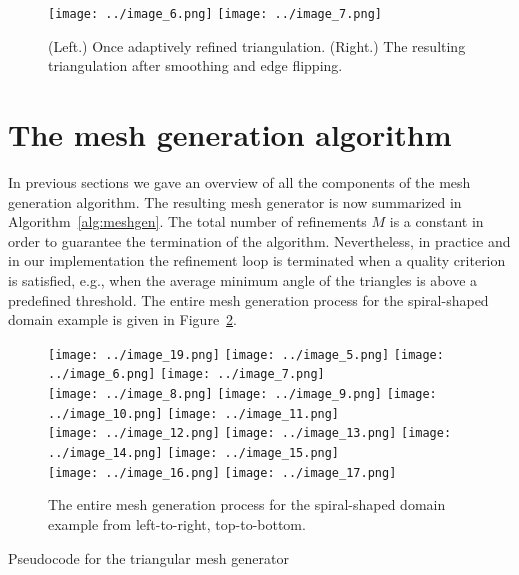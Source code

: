 \documentclass[12pt]{article}
\begin{document}
\begin{figure}[htbp]
\centering
\texttt{[image: ../image\_6.png]}
\texttt{[image: ../image\_7.png]}
\caption{(Left.) Once adaptively refined triangulation. (Right.) The resulting
  triangulation after smoothing and edge flipping.}
\label{fig:firstsmooth}
\end{figure}

\section{The mesh generation algorithm}
\label{sec:orgff9b6c1}

In previous sections we gave an overview of all the components of the mesh
generation algorithm.  The resulting mesh generator is now summarized in
Algorithm~\ref{alg:meshgen}.  The total number of refinements $M$ is a constant
in order to guarantee the termination of the algorithm.  Nevertheless, in
practice and in our implementation the refinement loop is terminated when a
quality criterion is satisfied, e.g., when the average minimum angle of the
triangles is above a predefined threshold.  The entire mesh generation process
for the spiral-shaped domain example is given in Figure~\ref{fig:spiralexample}.


\begin{figure}[htbp]
  \centering
  \texttt{[image: ../image\_19.png]}
  \texttt{[image: ../image\_5.png]}
  \texttt{[image: ../image\_6.png]}
  \texttt{[image: ../image\_7.png]}\\
  \texttt{[image: ../image\_8.png]}
  \texttt{[image: ../image\_9.png]}
  \texttt{[image: ../image\_10.png]}
  \texttt{[image: ../image\_11.png]}\\
  \texttt{[image: ../image\_12.png]}
  \texttt{[image: ../image\_13.png]}
  \texttt{[image: ../image\_14.png]}
  \texttt{[image: ../image\_15.png]}\\
  \texttt{[image: ../image\_16.png]}
  \texttt{[image: ../image\_17.png]}
  \caption{The entire mesh generation process for the spiral-shaped domain
    example from left-to-right, top-to-bottom.}
\label{fig:spiralexample}
\end{figure}


\begin{algorithm}[H]
  \caption{Pseudocode for the triangular mesh generator}
  \label{alg:meshgen}
  \begin{algorithmic}[1]
    \Statex
    \EndFor
    \State {}
    \EndFunction
  \end{algorithmic}
\end{algorithm}
\end{document}
